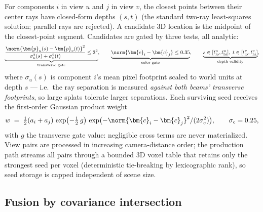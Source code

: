 For components $i$ in view $u$ and $j$ in view $v$, the closest points between their center
rays have closed-form depths $(s, t)$ (the standard two-ray least-squares solution; parallel
rays are rejected).  A candidate 3D location is the midpoint of the closest-point segment.
Candidates are gated by three tests, all analytic:
\begin{equation}
  \underbrace{\frac{\norm{\bm{p}_u(s) - \bm{p}_v(t)}^2}
       {\sigma_u^2(s) + \sigma_v^2(t)} \le 3^2}_{\text{transverse gate}},
  \qquad
  \underbrace{\norm{\bm{c}_i - \bm{c}_j} \le 0.35}_{\text{color gate}},
  \qquad
  \underbrace{s \in [t^u_{\mathrm{lo}}, t^u_{\mathrm{hi}}],\;
              t \in [t^v_{\mathrm{lo}}, t^v_{\mathrm{hi}}]}_{\text{depth validity}},
  \label{eq:gates}
\end{equation}
where $\sigma_u(s)$ is component $i$'s mean pixel footprint scaled to world units at depth $s$
--- i.e.\ the ray separation is measured \emph{against both beams' transverse footprints}, so
large splats tolerate larger separations.  Each surviving seed receives the first-order
Gaussian product weight
\begin{equation}
  w \;=\; \tfrac12 (a_i + a_j)\,
          \exp\!\big({-\tfrac12\, g}\big)\,
          \exp\!\big({-\norm{\bm{c}_i - \bm{c}_j}^2 / (2\sigma_c^2)}\big),
  \qquad \sigma_c = 0.25,
  \label{eq:seed-weight}
\end{equation}
with $g$ the transverse gate value: negligible cross terms are never materialized.  View
pairs are processed in increasing camera-distance order; the production path streams all
pairs through a bounded 3D voxel table that retains only the strongest seed per voxel
(deterministic tie-breaking by lexicographic rank), so seed storage is capped independent of
scene size.

\subsection{Fusion by covariance intersection}
\label{sec:ci-fusion}

